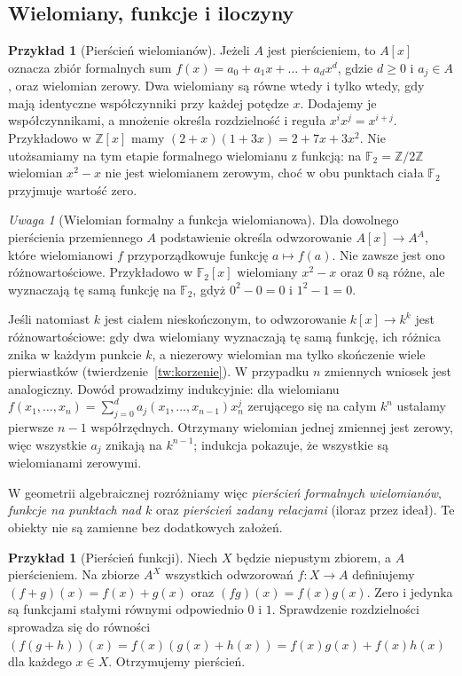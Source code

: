 \documentclass[11pt,a4paper,openany]{report}
\numberwithin{equation}{section}
\theoremstyle{plain}
\theoremstyle{definition}
\newtheorem{przyklad}[twierdzenie]{Przykład}
\theoremstyle{remark}
\newtheorem{uwaga}[twierdzenie]{Uwaga}
\newcommand{\Z}{\mathbb Z}
\newcommand{\F}{\mathbb F}
\begin{document}
\subsection{Wielomiany, funkcje i iloczyny}

\begin{przyklad}[Pierścień wielomianów]
Jeżeli $A$ jest pierścieniem, to $A[x]$ oznacza zbiór formalnych sum
$f(x)=a_0+a_1x+\dots+a_dx^d$, gdzie $d\ge0$ i $a_j\in A$, oraz wielomian
zerowy. Dwa wielomiany są równe wtedy i tylko wtedy, gdy mają identyczne
współczynniki przy każdej potędze $x$. Dodajemy je współczynnikami,
a mnożenie określa rozdzielność i reguła $x^ix^j=x^{i+j}$.
Przykładowo w $\Z[x]$ mamy
$(2+x)(1+3x)=2+7x+3x^2$.
Nie utożsamiamy na tym etapie formalnego wielomianu z funkcją:
na $\F_2=\Z/2\Z$ wielomian $x^2-x$ nie jest wielomianem zerowym,
choć w obu punktach ciała $\F_2$ przyjmuje wartość zero.
\end{przyklad}

\begin{uwaga}[Wielomian formalny a funkcja wielomianowa]
\label{uw:formalna-funkcja}
Dla dowolnego pierścienia przemiennego $A$ podstawienie określa
odwzorowanie $A[x]\to A^A$, które wielomianowi $f$ przyporządkowuje
funkcję $a\mapsto f(a)$. Nie zawsze jest ono różnowartościowe.
Przykładowo w $\mathbb F_2[x]$ wielomiany $x^2-x$ oraz $0$ są różne,
ale wyznaczają tę samą funkcję na $\mathbb F_2$, gdyż
$0^2-0=0$ i $1^2-1=0$.

Jeśli natomiast $k$ jest ciałem nieskończonym, to odwzorowanie
$k[x]\to k^k$ jest różnowartościowe: gdy dwa wielomiany wyznaczają tę samą
funkcję, ich różnica znika w każdym punkcie $k$, a niezerowy wielomian
ma tylko skończenie wiele pierwiastków (twierdzenie~\ref{tw:korzenie}).
W przypadku $n$ zmiennych wniosek jest analogiczny. Dowód prowadzimy
indukcyjnie: dla wielomianu
$f(x_1,\dots,x_n)=\sum_{j=0}^d a_j(x_1,\dots,x_{n-1})x_n^j$
zerującego się na całym $k^n$ ustalamy pierwsze $n-1$ współrzędnych.
Otrzymany wielomian jednej zmiennej jest zerowy, więc wszystkie
$a_j$ znikają na $k^{n-1}$; indukcja pokazuje, że wszystkie są
wielomianami zerowymi.

W geometrii algebraicznej rozróżniamy więc 
\emph{pierścień formalnych wielomianów}, 
\emph{funkcje na punktach nad $k$} oraz 
\emph{pierścień zadany relacjami} (iloraz przez ideał).
Te obiekty nie są zamienne bez dodatkowych założeń.
\end{uwaga}

\begin{przyklad}[Pierścień funkcji]
Niech $X$ będzie niepustym zbiorem, a $A$ pierścieniem.
Na zbiorze $A^X$ wszystkich odwzorowań $f\colon X\to A$ definiujemy
$(f+g)(x)=f(x)+g(x)$ oraz $(fg)(x)=f(x)g(x)$.
Zero i jedynka są funkcjami stałymi równymi odpowiednio $0$ i $1$.
Sprawdzenie rozdzielności sprowadza się do równości
$(f(g+h))(x)=f(x)(g(x)+h(x))=f(x)g(x)+f(x)h(x)$
dla każdego $x\in X$. Otrzymujemy pierścień.
\end{przyklad}
\end{document}
